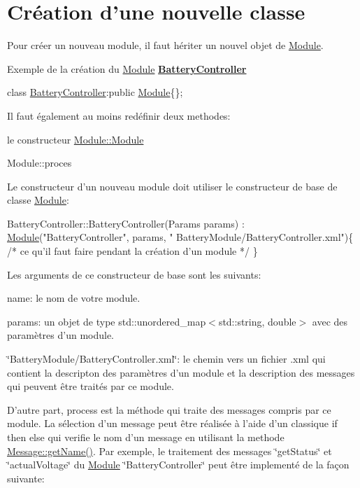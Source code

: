 \hypertarget{docModule_classCreation}{}\section{Création d'une nouvelle classe}\label{docModule_classCreation}
Pour créer un nouveau module, il faut hériter un nouvel objet de \hyperlink{classModule}{Module}.

Exemple de la création du \hyperlink{classModule}{Module} {\bfseries \hyperlink{classBatteryController}{Battery\-Controller}}

{\ttfamily class \hyperlink{classBatteryController}{Battery\-Controller}\-:public \hyperlink{classModule}{Module}\{\};}

Il faut également au moins redéfinir deux methodes\-:
\begin{DoxyEnumerate}
\item le constructeur \hyperlink{classModule_abcdd948c7444d3420f04be1bd332fbae}{Module\-::\-Module}
\item Module\-::proces
\end{DoxyEnumerate}

Le constructeur d'un nouveau module doit utiliser le constructeur de base de classe \hyperlink{classModule}{Module}\-:


\begin{DoxyCode}
BatteryController::BatteryController(Params params) : \hyperlink{classModule}{Module}(\textcolor{stringliteral}{"BatteryController"}, params, \textcolor{stringliteral}{"
      BatteryModule/BatteryController.xml"})\{
    \textcolor{comment}{/* ce qu'il faut faire pendant la création d'un module */}
\}
\end{DoxyCode}


Les arguments de ce constructeur de base sont les suivants\-:
\begin{DoxyEnumerate}
\item name\-: le nom de votre module.
\item params\-: un objet de type {\ttfamily std\-::unordered\-\_\-map$<$std\-::string, double$>$} avec des paramètres d'un module.
\item \char`\"{}\-Battery\-Module/\-Battery\-Controller.\-xml\char`\"{}\-: le chemin vers un fichier {\ttfamily .xml} qui contient la descripton des paramètres d'un module et la description des messages qui peuvent être traités par ce module.
\end{DoxyEnumerate}

D'autre part, process est la méthode qui traite des messages compris par ce module. La sélection d'un message peut être réalisée à l'aide d'un classique {\ttfamily if then else} qui verifie le nom d'un message en utilisant la methode \hyperlink{classMessage_ac03b02000572b0852c574498bf138e87}{Message\-::get\-Name()}. Par exemple, le traitement des messages \char`\"{}get\-Status\char`\"{} et \char`\"{}actual\-Voltage\char`\"{} du \hyperlink{classModule}{Module} \char`\"{}\-Battery\-Controller\char`\"{} peut être implementé de la façon suivante\-:


